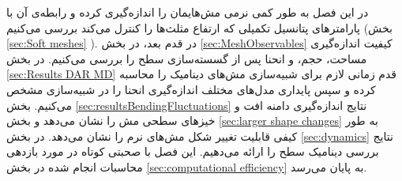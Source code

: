 در این فصل به طور کمی نرمی‌ مش‌هایمان را اندازه‌گیری کرده و رابطه‌ی آن با پارامتر‌های پتانسیل‌ تکمیلی که ارتفاع مثلث‌ها را کنترل می‌کند بررسی می‌کنیم (بخش
\ref{sec:Soft meshes}
). در قدم بعد، در بخش 
\ref{sec:MeshObservables}
کیفیت اندازه‌گیری مساحت، حجم، و انحنا پس از گسسته‌سازی سطح را بررسی می‌کنیم. در بخش
\ref{sec:Results DAR MD}
قدم زمانی لازم برای شبیه‌سازی مش‌های دینامیک را محاسبه کرده و سپس پایداری مدل‌های مختلف اندازه‌گیری انحنا را در شبیه‌سازی مشخص می‌کنیم. بخش 
\ref{sec:resultsBendingFluctuations}  
نتایج اندازه‌گیری دامنه افت و خیزهای سطحی مش را نشان می‌دهد و بخش 
\ref{sec:larger shape changes}
به طور کیفی قابلیت تغییر شکل مش‌های نرم را نشان می‌دهد. در بخش
\ref{sec:dynamics}
نتایج بررسی دینامیک سطح را ارائه می‌دهیم. این فصل با صحبتی کوتاه در مورد بازدهی‌ محاسبات انجام شده در بخش
\ref{sec:computational efficiency}
به پایان می‌رسد.